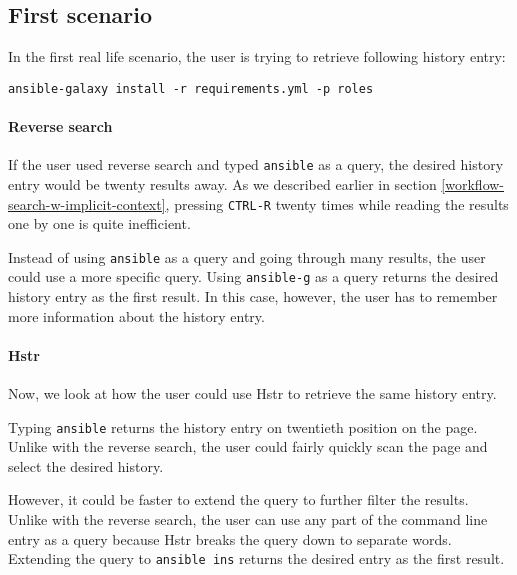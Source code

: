 \subsection{First scenario}

In the first real life scenario, the user is trying to retrieve following history entry: 

\begin{verbatim}
ansible-galaxy install -r requirements.yml -p roles
\end{verbatim}


\paragraph{Reverse search}
If the user used reverse search and typed \verb|ansible| as a query, the desired history entry would be twenty results away. As we described earlier in section  \ref{workflow-search-w-implicit-context}, pressing \verb|CTRL-R| twenty times while reading the results one by one is quite inefficient.

Instead of using \verb|ansible| as a query and going through many results, the user could use a more specific query. Using \verb|ansible-g| as a query returns the desired history entry as the first result. In this case, however, the user has to remember more information about the history entry.

\paragraph{Hstr}
Now, we look at how the user could use Hstr to retrieve the same history entry.

Typing \verb|ansible| returns the history entry on twentieth position on the page. Unlike with the reverse search, the user could fairly quickly scan the page and select the desired history. 

However, it could be faster to extend the query to further filter the results. Unlike with the reverse search, the user can use any part of the command line entry as a query because Hstr breaks the query down to separate words. Extending the query to \verb|ansible ins| returns the desired entry as the first result.


